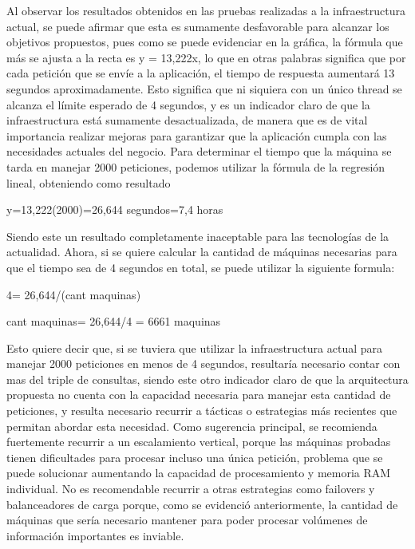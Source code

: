 \documentclass[a4paper]{article}
\begin{document}
Al observar los resultados obtenidos en las pruebas realizadas a la infraestructura actual, se puede afirmar que esta es sumamente desfavorable para alcanzar los objetivos propuestos, pues como se puede evidenciar en la gráfica, la fórmula que más se ajusta a la recta es y = 13,222x, lo que en otras palabras significa que por cada petición que se envíe a la aplicación, el tiempo de respuesta aumentará 13 segundos aproximadamente. Esto significa que ni siquiera con un único thread se alcanza el límite esperado de 4 segundos, y es un indicador claro de que la infraestructura está sumamente desactualizada, de manera que es de vital importancia realizar mejoras para garantizar que la aplicación cumpla con las necesidades actuales del negocio.
Para determinar el tiempo que la máquina se tarda en manejar 2000 peticiones, podemos utilizar la fórmula de la regresión lineal, obteniendo como resultado
\begin{center}
    y=13,222(2000)=26,644 segundos=7,4 horas    
\end{center}

Siendo este un resultado completamente inaceptable para las tecnologías de la actualidad.
Ahora, si se quiere calcular la cantidad de máquinas necesarias para que el tiempo sea de 4 segundos en total, se puede utilizar la siguiente formula:

\begin{center}
    4= 26,644/(cant maquinas)
    
    cant maquinas= 26,644/4 = 6661 maquinas        
\end{center}

Esto quiere decir que, si se tuviera que utilizar la infraestructura actual para manejar 2000 peticiones en menos de 4 segundos, resultaría necesario contar con mas del triple de consultas, siendo este otro indicador claro de que la arquitectura propuesta no cuenta con la capacidad necesaria para manejar esta cantidad de peticiones, y resulta necesario recurrir a tácticas o estrategias más recientes que permitan abordar esta necesidad. Como sugerencia principal, se recomienda fuertemente recurrir a un escalamiento vertical, porque las máquinas probadas tienen dificultades para procesar incluso una única petición, problema que se puede solucionar aumentando la capacidad de procesamiento y memoria RAM individual. No es recomendable recurrir a otras estrategias como failovers y balanceadores de carga porque, como se evidenció anteriormente, la cantidad de máquinas que sería necesario mantener para poder procesar volúmenes de información importantes es inviable.
\end{document}
